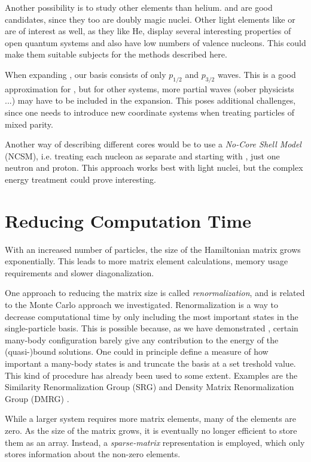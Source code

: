 \documentclass[../main/report.tex]{subfiles}
\begin{document}
Another possibility is to study other elements than helium.  and  are good candidates, since they too are doubly magic nuclei.
Other light elements like  or  are of interest as well, as they like He, display several interesting properties of open quantum systems and also have low numbers of valence nucleons. 
This could make them suitable subjects for the methods described here.

When expanding , our basis consists of only $p_{1/2}$ and $p_{3/2}$ waves. 
This is a good approximation for  \cite{gamow_shell_model_2008},  but for other systems, more partial waves (sober physicists ...) may have to be included in the expansion.
This poses additional challenges, since one needs to introduce new coordinate systems when treating particles of mixed parity. 

Another way of describing different cores would be to use a \emph{No-Core Shell Model} (NCSM), i.e. treating each nucleon as separate and starting with , just one neutron and proton. 
This approach works best with light nuclei, but the complex energy treatment could prove interesting.

\section{Reducing Computation Time}
With an increased number of particles, the size of the Hamiltonian matrix grows exponentially. This leads to more matrix element calculations, memory usage requirements and slower diagonalization.

One approach to reducing the matrix size is called \emph{renormalization}, and is related to the Monte Carlo approach we investigated. 
Renormalization is a way to decrease computational time by only including the most important states in the single-particle basis.
This is possible because, as we have demonstrated
, certain many-body configuration barely give any contribution to the energy of the (quasi-)bound solutions. 
One could in principle define a  measure of how important a many-body states is and truncate the basis at a set treshold value. 
This kind of procedure has already been used to some extent. 
Examples are the Similarity Renormalization Group (SRG) and Density Matrix Renormalization Group (DMRG) \cite{DMRG}. 


While a larger system requires more matrix elements, many of the elements are zero. 
As the size of the matrix grows, it is eventually no longer efficient to store them as an array. 
Instead, a \emph{sparse-matrix} representation is employed, which only stores information about the non-zero elements. 
\end{document}

